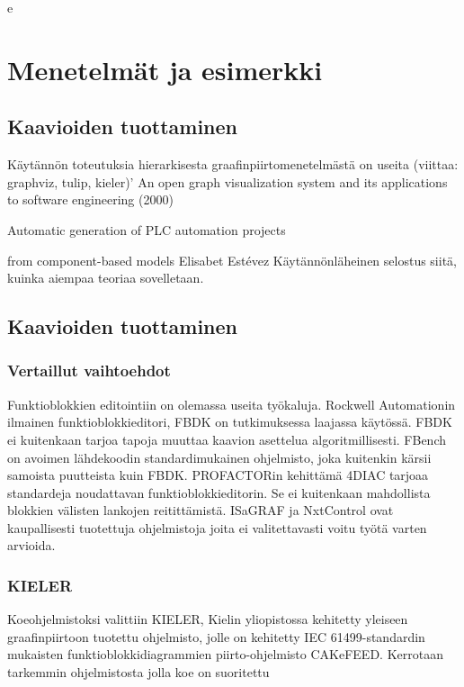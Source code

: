 e	\documentclass[finnish,12pt]{article}
\begin{document}
	\section{Menetelmät ja esimerkki}

		\subsection{Kaavioiden tuottaminen}

Käytännön toteutuksia hierarkisesta graafinpiirtomenetelmästä on useita
(viittaa: graphviz, tulip, kieler)’
An open graph visualization system and its applications to software engineering
(2000) 

Automatic generation of PLC automation projects

from component-based models
Elisabet Estévez
Käytännönläheinen selostus siitä, kuinka aiempaa teoriaa sovelletaan.

		\subsection{Kaavioiden tuottaminen}
			\subsubsection{Vertaillut vaihtoehdot}
	
Funktioblokkien editointiin on olemassa useita työkaluja.
Rockwell Automationin ilmainen funktioblokkieditori, FBDK on tutkimuksessa
laajassa käytössä.
FBDK ei kuitenkaan tarjoa tapoja muuttaa kaavion asettelua algoritmillisesti.
FBench on avoimen lähdekoodin standardimukainen ohjelmisto, joka kuitenkin
kärsii samoista puutteista kuin FBDK.
PROFACTORin kehittämä 4DIAC tarjoaa standardeja noudattavan
funktioblokkieditorin.
Se ei kuitenkaan mahdollista blokkien välisten lankojen reitittämistä.
ISaGRAF ja NxtControl ovat kaupallisesti tuotettuja ohjelmistoja joita ei
valitettavasti voitu työtä varten arvioida.

			\subsubsection{KIELER}

Koeohjelmistoksi valittiin KIELER, Kielin yliopistossa kehitetty yleiseen
graafinpiirtoon tuotettu ohjelmisto, jolle on kehitetty IEC 61499-standardin
mukaisten funktioblokkidiagrammien piirto-ohjelmisto CAKeFEED. 
Kerrotaan tarkemmin ohjelmistosta jolla koe on suoritettu
\end{document}
